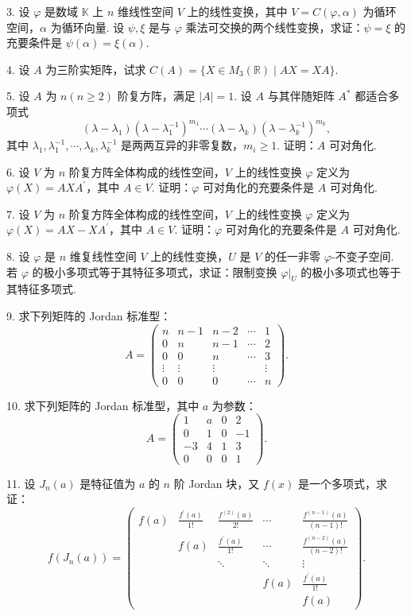 \documentclass[UTF8, 12pt, fontset=fandol, oneside]{ctexart}
\begin{document}
3. 设 $\varphi$ 是数域 $\mathbb{K}$ 上 $n$ 维线性空间 $V$ 上的线性变换，其中 $V=C(\varphi,\alpha)$ 为循环空间，$\alpha$ 为循环向量. 设 $\psi,\xi$ 是与 $\varphi$ 乘法可交换的两个线性变换，求证：$\psi=\xi$ 的充要条件是 $\psi(\alpha)=\xi(\alpha)$.

4. 设 $A$ 为三阶实矩阵，试求 $C(A)=\{X\in M_3(\mathbb{R})\mid AX=XA\}$.

5. 设 $A$ 为 $n(n\ge2)$ 阶复方阵，满足 $|A|=1$. 设 $A$ 与其伴随矩阵 $A^*$ 都适合多项式
\[
(\lambda-\lambda_1)(\lambda-\lambda_1^{-1})^{m_1}\cdots(\lambda-\lambda_k)(\lambda-\lambda_k^{-1})^{m_k},
\]
其中 $\lambda_1,\lambda_1^{-1},\cdots,\lambda_k,\lambda_k^{-1}$ 是两两互异的非零复数，$m_i\ge1$. 证明：$A$ 可对角化.

6. 设 $V$ 为 $n$ 阶复方阵全体构成的线性空间，$V$ 上的线性变换 $\varphi$ 定义为 $\varphi(X)=AXA^{\prime}$，其中 $A\in V$. 证明：$\varphi$ 可对角化的充要条件是 $A$ 可对角化.

7. 设 $V$ 为 $n$ 阶复方阵全体构成的线性空间，$V$ 上的线性变换 $\varphi$ 定义为 $\varphi(X)=AX-XA^{\prime}$，其中 $A\in V$. 证明：$\varphi$ 可对角化的充要条件是 $A$ 可对角化.

8. 设 $\varphi$ 是 $n$ 维复线性空间 $V$ 上的线性变换，$U$ 是 $V$ 的任一非零 $\varphi$-不变子空间. 若 $\varphi$ 的极小多项式等于其特征多项式，求证：限制变换 $\varphi|_U$ 的极小多项式也等于其特征多项式.

9. 求下列矩阵的 Jordan 标准型：
\[
A=\left(\begin{array}{ccccc}
n&n-1&n-2&\cdots&1\\
0&n&n-1&\cdots&2\\
0&0&n&\cdots&3\\
\vdots&\vdots&\vdots&&\vdots\\
0&0&0&\cdots&n
\end{array}\right).
\]

10. 求下列矩阵的 Jordan 标准型，其中 $a$ 为参数：
\[
A=\left(\begin{array}{rrrr}
1&a&0&2\\
0&1&0&-1\\
-3&4&1&3\\
0&0&0&1
\end{array}\right).
\]

11. 设 $J_n(a)$ 是特征值为 $a$ 的 $n$ 阶 Jordan 块，又 $f(x)$ 是一个多项式，求证：
\[
f(J_n(a))=\left(\begin{array}{ccccc}
f(a)&\frac{f^{\prime}(a)}{1!}&\frac{f^{(2)}(a)}{2!}&\cdots&\frac{f^{(n-1)}(a)}{(n-1)!}\\
&f(a)&\frac{f^{\prime}(a)}{1!}&\cdots&\frac{f^{(n-2)}(a)}{(n-2)!}\\
&&\ddots&\ddots&\vdots\\
&&&f(a)&\frac{f^{\prime}(a)}{1!}\\
&&&&f(a)
\end{array}\right).
\]
\end{document}

